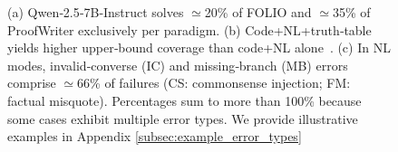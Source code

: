 \begin{figure}[t]
\begin{tikzpicture}
\end{tikzpicture}

\vspace{-1em}
\caption{\footnotesize{(a) Qwen‑2.5‑7B‑Instruct solves $\simeq$20\% of FOLIO and $\simeq$35\% of ProofWriter exclusively per paradigm. (b) Code+NL+truth‑table yields higher upper‑bound coverage than code+NL alone~\cite{Xiong2024HYBRIDMINDMS}. (c) In NL modes, invalid‑converse (IC) and missing‑branch (MB) errors comprise $\simeq$66\% of failures (CS: commonsense injection; FM: factual misquote). Percentages sum to more than 100\% because some cases exhibit multiple error types. We provide illustrative examples in Appendix \ref{subsec:example_error_types}}}
\label{fig:motivation}
\vspace{-2em}
\end{figure}
